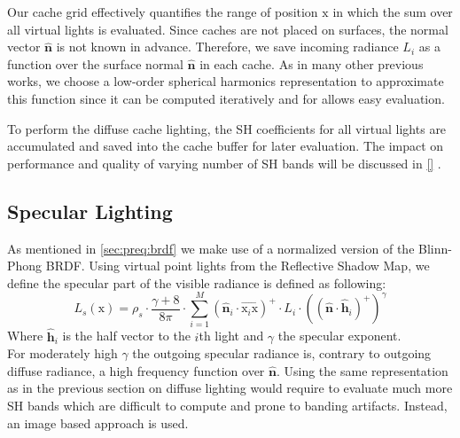 \documentclass[thesis.tex]{subfiles}
\begin{document}
Our cache grid effectively quantifies the range of position $\mathrm{x}$ in which the sum over all virtual lights is evaluated.
Since caches are not placed on surfaces, the normal vector $\hat{\mathbf{n}}$ is not known in advance.
Therefore, we save incoming radiance $L_i$ as a function over the surface normal $\hat{\mathbf{n}}$ in each cache.
As in many other previous works, we choose a low-order spherical harmonics representation to approximate this function since it can be computed iteratively and for allows easy evaluation.

To perform the diffuse cache lighting, the SH coefficients for all virtual lights are accumulated and saved into the cache buffer for later evaluation.
The impact on performance and quality of varying number of SH bands will be discussed in \autoref{} .

\subsection{Specular Lighting} \label{sec:impl:specenvmap}
As mentioned in \autoref{sec:preq:brdf} we make use of a normalized version of the Blinn-Phong BRDF.
Using virtual point lights from the Reflective Shadow Map, we define the specular part of the visible radiance is defined as following:
\begin{equation}
L_s (\mathrm{x}) = \rho_s \cdot \frac{\gamma + 8}{8\pi} \cdot \sum\limits_{i=1}^{M}
(\hat{\mathbf{n}}_i\cdot \overrightarrow{\mathrm{x}_i\mathrm{x}})^+ \cdot L_i \cdot ((\hat{\mathbf{n}} \cdot \hat{\mathbf{h}}_i)^+)^\gamma
\end{equation}
Where $\hat{\mathbf{h}}_i$ is the half vector to the $i$th light and $\gamma$ the specular exponent.
\\
For moderately high $\gamma$ the outgoing specular radiance is, contrary to outgoing diffuse radiance, a high frequency function over $\hat{\mathbf{n}}$.
Using the same representation as in the previous section on diffuse lighting would require to evaluate much more SH bands which are difficult to compute and prone to banding artifacts.
Instead, an image based approach is used.
\end{document}
